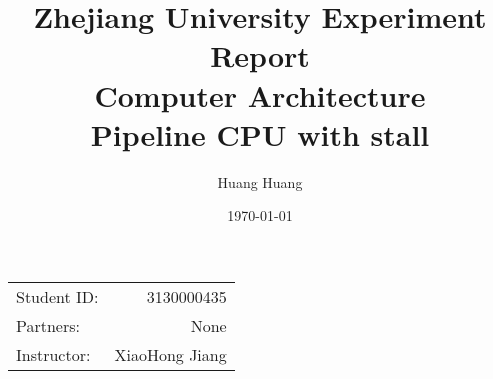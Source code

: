 \documentclass{article}
\title{Zhejiang University Experiment Report \\ Computer Architecture  \\ Pipeline CPU with stall} %
\author{Huang Huang} %
\date{\today} %
\begin{document}
\maketitle %

\begin{center}
\begin{tabular}{l r}
Student ID: & 3130000435 \\
Partners: & None \\
Instructor: & XiaoHong Jiang
\end{tabular}
\end{center}
\end{document}
